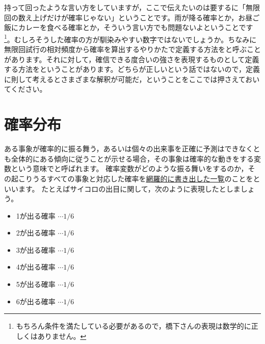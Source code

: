 \documentclass{ltjbook}
\begin{document}
持って回ったような言い方をしていますが，ここで伝えたいのは要するに「無限回の数え上げだけが確率じゃない」ということです。雨が降る確率とか，お昼ご飯にカレーを食べる確率とか，そういう言い方でも問題ないよということです\footnote{もちろん条件を満たしている必要があるので，橋下さんの表現は数学的に正しくはありません。}。むしろそうした確率の方が馴染みやすい数字ではないでしょうか。ちなみに無限回試行の相対頻度から確率を算出するやりかたで定義する方法をと呼ぶことがあります。それに対して，確信できる度合いの強さを表現するものとして定義する方法をということがあります。どちらが正しいという話ではないので，定義に則して考えるとさまざまな解釈が可能だ，ということをここでは押さえておいてください。

\section{確率分布}
ある事象が確率的に振る舞う，あるいは個々の出来事を正確に予測はできなくとも全体的にある傾向に従うことが示せる場合，その事象は確率的な動きをする変数という意味でと呼ばれます。
確率変数がどのような振る舞いをするのか，その起こりうるすべての事象と対応した確率を\underline{網羅的に書き出した一覧}のことをといいます。
たとえばサイコロの出目に関して，次のように表現したとしましょう。
\begin{itemize}
	\item 1が出る確率 $\cdots 1/6$
	\item 2が出る確率 $\cdots 1/6$
	\item 3が出る確率 $\cdots 1/6$
	\item 4が出る確率 $\cdots 1/6$
	\item 5が出る確率 $\cdots 1/6$
	\item 6が出る確率 $\cdots 1/6$
\end{itemize}
\end{document}
